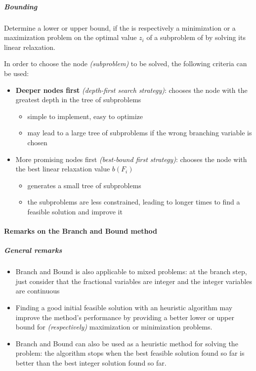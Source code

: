 \documentclass[english]{article}
\begin{document}
\subparagraph*{Bounding}

Determine a lower or upper bound, if the \ILP is respectively a minimization or a maximization problem on the optimal value \(z_i\) of a subproblem of \ILP by solving its linear relaxation.

\bigskip
In order to choose the node \textit{(subproblem)} to be solved, the following criteria can be used:

\begin{itemize}
  \item \textbf{Deeper nodes first} \textit{(depth-first search strategy)}: chooses the node with the greatest depth in the tree of subproblems
        \begin{itemize}
          \item[\cmarkthin] simple to implement, easy to optimize
          \item[\xmarkthin] may lead to a large tree of subproblems if the wrong branching variable is chosen
        \end{itemize}
  \item More promising nodes first \textit{(best-bound first strategy)}: chooses the node with the best linear relaxation value \(b(F_i)\)
        \begin{itemize}
          \item[\cmarkthin] generates a small tree of subproblems
          \item[\xmarkthin] the subproblems are less constrained, leading to longer times to find a feasible solution and improve it
        \end{itemize}
\end{itemize}

\paragraph{Remarks on the Branch and Bound method}

\subparagraph*{General remarks}
\begin{itemize}
  \item Branch and Bound is also applicable to mixed \ILP problems: at the branch step, just consider that the fractional variables are integer and the integer variables are continuous
  \item Finding a good initial feasible solution with an heuristic algorithm may improve the method's performance by providing a better lower or upper bound for \textit{(respectively)} maximization or minimization problems.
  \item Branch and Bound can also be used as a heuristic method for solving the \ILP problem: the algorithm stops when the best feasible solution found so far is better than the best integer solution found so far.
\end{itemize}
\end{document}
